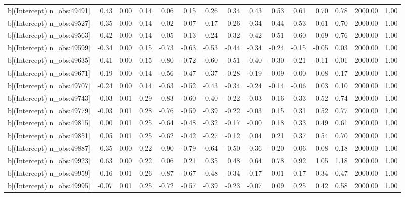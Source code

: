 \begin{table}[ht]
\begin{tabular}{rrrrrrrrrrrrrrr}
  b[(Intercept) n\_obs:49491] & 0.43 & 0.00 & 0.14 & 0.06 & 0.15 & 0.26 & 0.34 & 0.43 & 0.53 & 0.61 & 0.70 & 0.78 & 2000.00 & 1.00 \\ 
  b[(Intercept) n\_obs:49527] & 0.35 & 0.00 & 0.14 & -0.02 & 0.07 & 0.17 & 0.26 & 0.34 & 0.44 & 0.53 & 0.61 & 0.70 & 2000.00 & 1.00 \\ 
  b[(Intercept) n\_obs:49563] & 0.42 & 0.00 & 0.14 & 0.05 & 0.13 & 0.24 & 0.32 & 0.42 & 0.51 & 0.60 & 0.69 & 0.76 & 2000.00 & 1.00 \\ 
  b[(Intercept) n\_obs:49599] & -0.34 & 0.00 & 0.15 & -0.73 & -0.63 & -0.53 & -0.44 & -0.34 & -0.24 & -0.15 & -0.05 & 0.03 & 2000.00 & 1.00 \\ 
  b[(Intercept) n\_obs:49635] & -0.41 & 0.00 & 0.15 & -0.80 & -0.72 & -0.60 & -0.51 & -0.40 & -0.30 & -0.21 & -0.11 & 0.01 & 2000.00 & 1.00 \\ 
  b[(Intercept) n\_obs:49671] & -0.19 & 0.00 & 0.14 & -0.56 & -0.47 & -0.37 & -0.28 & -0.19 & -0.09 & -0.00 & 0.08 & 0.17 & 2000.00 & 1.00 \\ 
  b[(Intercept) n\_obs:49707] & -0.24 & 0.00 & 0.14 & -0.63 & -0.52 & -0.43 & -0.34 & -0.24 & -0.14 & -0.06 & 0.03 & 0.10 & 2000.00 & 1.00 \\ 
  b[(Intercept) n\_obs:49743] & -0.03 & 0.01 & 0.29 & -0.83 & -0.60 & -0.40 & -0.22 & -0.03 & 0.16 & 0.33 & 0.52 & 0.74 & 2000.00 & 1.00 \\ 
  b[(Intercept) n\_obs:49779] & -0.03 & 0.01 & 0.28 & -0.76 & -0.59 & -0.39 & -0.22 & -0.03 & 0.15 & 0.31 & 0.52 & 0.77 & 2000.00 & 1.00 \\ 
  b[(Intercept) n\_obs:49815] & 0.00 & 0.01 & 0.25 & -0.64 & -0.48 & -0.32 & -0.17 & -0.00 & 0.18 & 0.33 & 0.49 & 0.61 & 2000.00 & 1.00 \\ 
  b[(Intercept) n\_obs:49851] & 0.05 & 0.01 & 0.25 & -0.62 & -0.42 & -0.27 & -0.12 & 0.04 & 0.21 & 0.37 & 0.54 & 0.70 & 2000.00 & 1.00 \\ 
  b[(Intercept) n\_obs:49887] & -0.35 & 0.00 & 0.22 & -0.90 & -0.79 & -0.64 & -0.50 & -0.36 & -0.20 & -0.06 & 0.08 & 0.18 & 2000.00 & 1.00 \\ 
  b[(Intercept) n\_obs:49923] & 0.63 & 0.00 & 0.22 & 0.06 & 0.21 & 0.35 & 0.48 & 0.64 & 0.78 & 0.92 & 1.05 & 1.18 & 2000.00 & 1.00 \\ 
  b[(Intercept) n\_obs:49959] & -0.16 & 0.01 & 0.26 & -0.87 & -0.67 & -0.48 & -0.34 & -0.17 & 0.01 & 0.17 & 0.34 & 0.47 & 2000.00 & 1.00 \\ 
  b[(Intercept) n\_obs:49995] & -0.07 & 0.01 & 0.25 & -0.72 & -0.57 & -0.39 & -0.23 & -0.07 & 0.09 & 0.25 & 0.42 & 0.58 & 2000.00 & 1.00 \\ 

\end{tabular}
\end{table}
